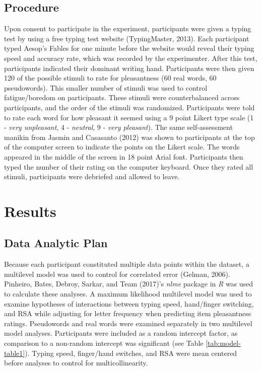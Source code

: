 \documentclass[english,man, mask]{apa6}
\theoremstyle{definition}
\theoremstyle{definition}
\theoremstyle{definition}
\theoremstyle{remark}
\begin{document}
\subsection{Procedure}\label{procedure}

Upon consent to participate in the experiment, participants were given a
typing test by using a free typing test website (TypingMaster, 2013).
Each participant typed Aesop's Fables for one minute before the website
would reveal their typing speed and accuracy rate, which was recorded by
the experimenter. After this test, participants indicated their dominant
writing hand. Participants were then given 120 of the possible stimuli
to rate for pleasantness (60 real words, 60 pseudowords). This smaller
number of stimuli was used to control fatigue/boredom on participants.
These stimuli were counterbalanced across participants, and the order of
the stimuli was randomized. Participants were told to rate each word for
how pleasant it seemed using a 9 point Likert type scale (1 - \emph{very
unpleasant}, 4 - \emph{neutral}, 9 - \emph{very pleasant}). The same
self-assessment manikin from Jasmin and Casasanto (2012) was shown to
participants at the top of the computer screen to indicate the points on
the Likert scale. The words appeared in the middle of the screen in 18
point Arial font. Participants then typed the number of their rating on
the computer keyboard. Once they rated all stimuli, participants were
debriefed and allowed to leave.

\section{Results}\label{results}

\subsection{Data Analytic Plan}\label{data-analytic-plan}

Because each participant constituted multiple data points within the
dataset, a multilevel model was used to control for correlated error
(Gelman, 2006). Pinheiro, Bates, Debroy, Sarkar, and Team (2017)'s
\emph{nlme} package in \emph{R} was used to calculate these analyses. A
maximum likelihood multilevel model was used to examine hypotheses of
interactions between typing speed, hand/finger switching, and RSA while
adjusting for letter frequency when predicting item pleasantness
ratings. Pseudowords and real words were examined separately in two
multilevel model analyses. Participants were included as a random
intercept factor, as comparison to a non-random intercept was
significant (see Table \ref{tab:model-table1}). Typing speed,
finger/hand switches, and RSA were mean centered before analyses to
control for multicollinearity.
\end{document}
